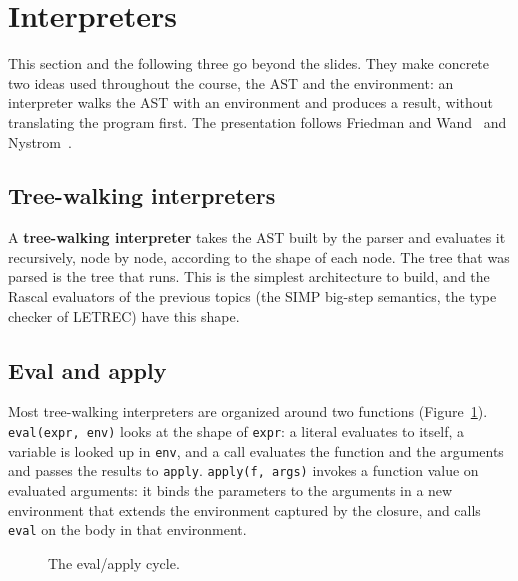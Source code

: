 \section{Interpreters}
\label{sec:interpreters}

This section and the following three go beyond the slides. They make concrete
two ideas used throughout the course, the AST and the environment: an
interpreter walks the AST with an environment and produces a result, without
translating the program first. The presentation follows Friedman and
Wand~\cite[Ch.~3]{friedman2008essentials} and
Nystrom~\cite[Part~II]{nystrom2021crafting}.

\subsection{Tree-walking interpreters}

A \textbf{tree-walking interpreter} takes the AST built by the parser and
evaluates it recursively, node by node, according to the shape of each node.
The tree that was parsed is the tree that runs. This is the simplest
architecture to build, and the Rascal evaluators of the previous topics
(the SIMP big-step semantics, the type checker of LETREC) have this shape.

\subsection{Eval and apply}

Most tree-walking interpreters are organized around two functions
(Figure~\ref{fig:eval-apply}). \texttt{eval(expr, env)} looks at the shape of
\texttt{expr}: a literal evaluates to itself, a variable is looked up in
\texttt{env}, and a call evaluates the function and the arguments and passes
the results to \texttt{apply}. \texttt{apply(f, args)} invokes a function value
on evaluated arguments: it binds the parameters to the arguments in a new
environment that extends the environment captured by the closure, and calls
\texttt{eval} on the body in that environment.

\begin{figure}[h]
\centering
{}
\caption{The eval/apply cycle.}
\label{fig:eval-apply}
\end{figure}

